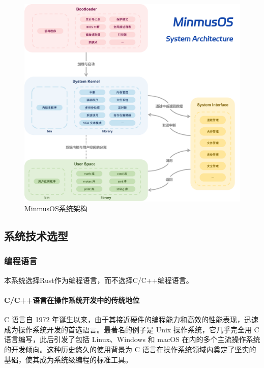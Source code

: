 \begin{figure}[htbp]
    \centering
    \includegraphics[width=\textwidth]{figures/SystemArchitecture.png}
    \caption{MinmusOS系统架构}
    \label{fig:SystemArchitecture}
\end{figure}

\subsection{系统技术选型}\label{sec:SystemTechnicalSelection}

\subsubsection{编程语言}

本系统选择Rust作为编程语言，而不选择C/C++编程语言。

\paragraph{C/C++语言在操作系统开发中的传统地位}

C 语言自 1972 年诞生以来，由于其接近硬件的编程能力和高效的性能表现，迅速成为操作系统开发的首选语言。最著名的例子是 Unix 操作系统，它几乎完全用 C 语言编写，此后引发了包括 Linux、Windows 和 macOS 在内的多个主流操作系统的开发倾向。这种历史悠久的使用背景为 C 语言在操作系统领域内奠定了坚实的基础，使其成为系统级编程的标准工具。

